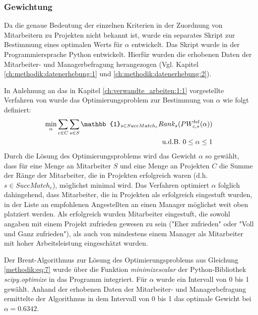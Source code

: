 \subsubsection{Gewichtung}
\label{ch:methodik:auswertung:gewichtung}
Da die genaue Bedeutung der einzelnen Kriterien in der Zuordnung von Mitarbeitern zu Projekten nicht bekannt ist, wurde ein separates Skript zur Bestimmung eines optimalen Werts für $\alpha$ entwickelt.
Das Skript wurde in der Programmiersprache Python entwickelt.
Hierfür wurden die erhobenen Daten der Mitarbeiter- und Managerbefragung herangezogen (Vgl. Kapitel \ref{ch:methodik:datenerhebung:1} und \ref{ch:methodik:datenerhebung:2}).

In Anlehnung an das in Kapitel \ref{ch:verwandte_arbeiten:1:1} vorgestellte Verfahren von \textcite[S. 131ff.]{kleinerman:2:inproceedings} wurde das Optimierungsproblem zur Bestimmung von $\alpha$ wie folgt definiert:
\begin{equation}\label{methodik:eq:7}
    \begin{aligned}
        \min_{\alpha} \sum_{c \in C} \sum_{s \in S} \mathbb{1}_{s \in SuccMatch_{c}} Rank_{s} (PW_{c,*}^{bil}(\alpha))\\
        \textnormal{u.d.B. } 0 \leq \alpha \leq 1\\
    \end{aligned}
\end{equation}
Durch die Lösung des Optimierungsproblems wird das Gewicht $\alpha$ so gewählt, dass für eine Menge an Mitarbeiter $S$ und eine Menge an Projekten $C$ die Summe der Ränge der Mitarbeiter, die in Projekten erfolgreich waren (d.h. $s \in SuccMatch_{c}$), möglichst minimal wird.
Das Verfahren optimiert $\alpha$ folglich dahingehend, dass Mitarbeiter, die in Projekten als erfolgreich eingestuft wurden, in der Liste an empfohlenen Angestellten an einen Manager möglichst weit oben platziert werden.
Als erfolgreich wurden Mitarbeiter eingestuft, die sowohl angaben mit einem Projekt zufrieden gewesen zu sein ("Eher zufrieden" oder "Voll und Ganz zufrieden"), als auch von mindestens einem Manager als Mitarbeiter mit hoher Arbeitsleistung eingeschätzt wurden.

Der Brent-Algorithmus zur Lösung des Optimierungsproblems aus Gleichung \ref{methodik:eq:7} wurde über die Funktion \textit{minimize\textunderscore scalar} der Python-Bibliothek \textit{scipy.opti\-mize} in das Programm integriert.
Für $\alpha$ wurde ein Intervall von 0 bis 1 gewählt.
Anhand der erhobenen Daten der Mitarbeiter- und Managerbefragung ermittelte der Algorithmus in dem Intervall von 0 bis 1 das optimale Gewicht bei $\alpha = 0.6342$.

